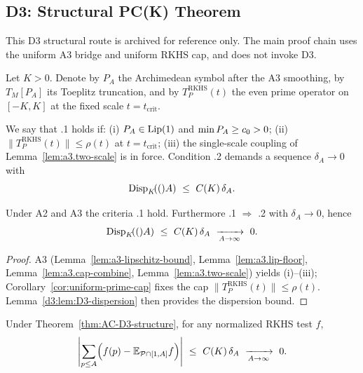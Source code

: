 \subsection{D3: Structural PC(K) Theorem}\label{d3:sec:D3-structural}
\begin{remark}
This D3 structural route is archived for reference only. The main proof chain uses the uniform A3 bridge and uniform RKHS cap, and does not invoke D3.
\end{remark}

\begin{definition}\label{def:D3-setup}
Let $K>0$.  Denote by $P_A$ the Archimedean symbol after the A3 smoothing, by $T_M[P_A]$ its Toeplitz truncation, and by $T_P^{\mathrm{RKHS}}(t)$ the even prime operator on $[-K,K]$ at the fixed scale $t=t_{\mathrm{crit}}$.
\end{definition}

\begin{definition}\label{def:AC-D3}
We say that \ACDthree.1 holds if: (i) $P_A\in\mathrm{Lip}(1)$ and $\min P_A\ge c_0>0$; (ii) $\|T_P^{\mathrm{RKHS}}(t)\|\le \rho(t)$ at $t=t_{\mathrm{crit}}$; (iii) the single-scale coupling of Lemma~\ref{lem:a3.two-scale} is in force.  Condition \ACDthree.2 demands a sequence $\delta_A\to0$ with
\[
  \DispK(A)\ \le\ C(K)\,\delta_A.
\]
\end{definition}

\begin{theorem}\label{thm:AC-D3-structure}
Under A2 and A3 the criteria \ACDthree.1 hold. Furthermore \ACDthree.1 $\Rightarrow$ \ACDthree.2 with $\delta_A\to0$, hence
\[
  \DispK(A)\ \le\ C(K)\,\delta_A\ \xrightarrow[A\to\infty]{}\ 0.
\]
\end{theorem}
\begin{proof}
A3 (Lemma~\ref{lem:a3-lipschitz-bound}, Lemma~\ref{lem:a3.lip-floor}, Lemma~\ref{lem:a3.cap-combine}, Lemma~\ref{lem:a3.two-scale}) yields (i)--(iii); Corollary~\ref{cor:uniform-prime-cap} fixes the cap $\|T_P^{\mathrm{RKHS}}(t)\|\le\rho(t)$.  Lemma~\ref{d3:lem:D3-dispersion} then provides the dispersion bound.
\end{proof}

\begin{corollary}[D3-lock]\label{d3:cor:D3-lock}
Under Theorem~\ref{thm:AC-D3-structure}, for any normalized RKHS test $f$,
\[
  \Biggl|\sum_{p\le A}\Bigl(f(p)-\mathbb{E}_{\mathcal{P}\cap[1,A]}f\Bigr)\Biggr|\ \le\ C(K)\,\delta_A\ \xrightarrow[A\to\infty]{}\ 0.
\]
\end{corollary}
